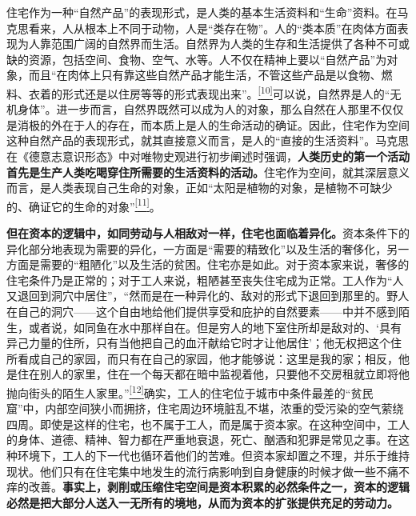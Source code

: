 \documentclass[UTF8, fontset = sourcesans, a4paper, oneside, zihao =
-4, scheme=chinese, no-math, space=true]{ctexbook}
\begin{document}
住宅作为一种``自然产品''的表现形式，是人类的基本生活资料和``生命''资料。在马克思看来，人从根本上不同于动物，人是``类存在物''。人的``类本质''在肉体方面表现为人靠范围广阔的自然界而生活。自然界为人类的生存和生活提供了各种不可或缺的资源，包括空间、食物、空气、水等。人不仅在精神上要以``自然产品''为对象，而且``在肉体上只有靠这些自然产品才能生活，不管这些产品是以食物、燃料、衣着的形式还是以住房等等的形式表现出来''。\protect\hypertarget{part0010_split_002.htmlux5cux23w10}{}{}\protect\hyperlink{part0010_split_002.htmlux5cux23m10}{\textsuperscript{{[}10{]}}}可以说，自然界是人的``无机身体''。进一步而言，自然界既然可以成为人的对象，那么自然在人那里不仅仅是消极的外在于人的存在，而本质上是人的生命活动的确证。因此，住宅作为空间这种自然产品的表现形式，就其直接意义而言，是人的``直接的生活资料''。马克思在《德意志意识形态》中对唯物史观进行初步阐述时强调，\textbf{人类历史的第一个活动首先是生产人类吃喝穿住所需要的生活资料的活动。}住宅作为空间，就其深层意义而言，是人类表现自己生命的对象，正如``太阳是植物的对象，是植物不可缺少的、确证它的生命的对象''\protect\hypertarget{part0010_split_002.htmlux5cux23w11}{}{}\protect\hyperlink{part0010_split_002.htmlux5cux23m11}{\textsuperscript{{[}11{]}}}。

\textbf{但在资本的逻辑中，如同劳动与人相敌对一样，住宅也面临着异化。}资本条件下的异化部分地表现为需要的异化，一方面是``需要的精致化''以及生活的奢侈化，另一方面是需要的``粗陋化''以及生活的贫困。住宅亦是如此。对于资本家来说，奢侈的住宅条件乃是正常的；对于工人来说，粗陋甚至丧失住宅成为正常。工人作为``人又退回到洞穴中居住''，``然而是在一种异化的、敌对的形式下退回到那里的。野人在自己的洞穴------这个自由地给他们提供享受和庇护的自然要素------中并不感到陌生，或者说，如同鱼在水中那样自在。但是穷人的地下室住所却是敌对的、`具有异己力量的住所，只有当他把自己的血汗献给它时才让他居住'；他无权把这个住所看成自己的家园，而只有在自己的家园，他才能够说：这里是我的家；相反，他是住在别人的家里，住在一个每天都在暗中监视着他，只要他不交房租就立即将他抛向街头的陌生人家里。''\protect\hypertarget{part0010_split_002.htmlux5cux23w12}{}{}\protect\hyperlink{part0010_split_002.htmlux5cux23m12}{\textsuperscript{{[}12{]}}}确实，工人的住宅位于城市中条件最差的``贫民窟''中，内部空间狭小而拥挤，住宅周边环境脏乱不堪，浓重的受污染的空气萦绕四周。即使是这样的住宅，也不属于工人，而是属于资本家。在这种空间中，工人的身体、道德、精神、智力都在严重地衰退，死亡、酗酒和犯罪是常见之事。在这种环境下，工人的下一代也循环着他们的苦难。但资本家却置之不理，并乐于维持现状。他们只有在住宅集中地发生的流行病影响到自身健康的时候才做一些不痛不痒的改善。\textbf{事实上，剥削或压缩住宅空间是资本积累的必然条件之一，资本的逻辑必然是把大部分人送入一无所有的境地，从而为资本的扩张提供充足的劳动力。}
\end{document}
